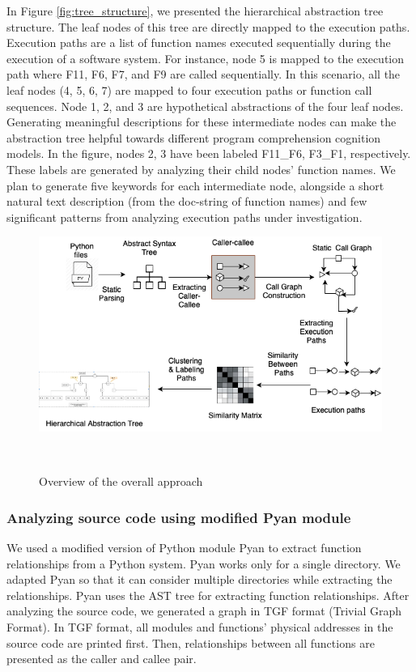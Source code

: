 In Figure \ref{fig:tree_structure}, we presented the hierarchical abstraction tree structure. The leaf nodes of this tree are directly mapped to the execution paths. Execution paths are a list of function names executed sequentially during the execution of a software system. For instance, node 5 is mapped to the execution path where F11, F6, F7, and F9 are called sequentially. 
In this scenario, all the leaf nodes (4, 5, 6, 7) are mapped to four execution paths or function call sequences.
Node 1, 2, and 3 are hypothetical abstractions of the four leaf nodes.
Generating meaningful descriptions for these intermediate nodes can make the abstraction tree helpful towards different program comprehension cognition models.
In the figure, nodes 2, 3 have been labeled F11\_F6, F3\_F1, respectively. These labels are generated by analyzing their child nodes' function names. We plan to generate five keywords for each intermediate node, alongside a short natural text description (from the doc-string of function names) and few significant patterns from analyzing execution paths under investigation.

\begin{figure}[tb]
  \centering
  \includegraphics[width=\columnwidth]{figures/hla2/approach_new.png}
  \caption{Overview of the overall approach}~\label{fig:overall}
\end{figure}

\subsubsection{Analyzing source code using modified Pyan module}

We used a modified version of Python module Pyan \cite{pyan} to extract function relationships from a Python system. Pyan works only for a single directory. We adapted Pyan so that it can consider multiple directories while extracting the relationships. Pyan uses the AST tree for extracting function relationships. After analyzing the source code, we generated a graph in TGF format (Trivial Graph Format). In TGF format, all modules and functions' physical addresses in the source code are printed first. Then, relationships between all functions are presented as the caller and callee pair.

